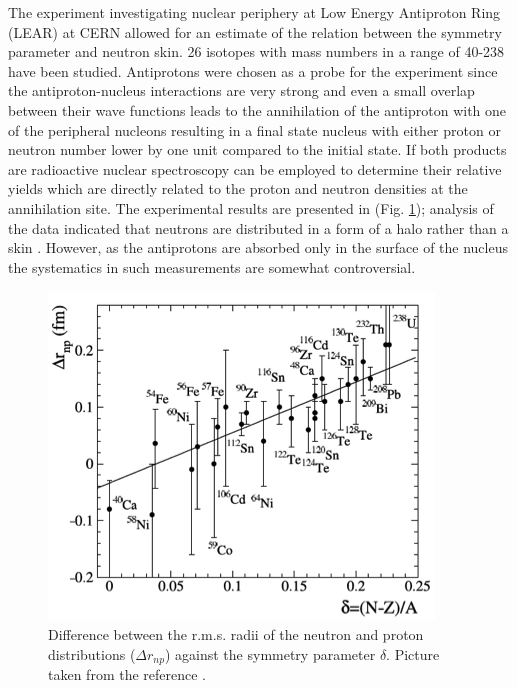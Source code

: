 \indent The experiment investigating nuclear periphery at Low Energy Antiproton Ring (LEAR) at CERN allowed for an estimate of the relation between the symmetry parameter and neutron skin. 26 isotopes with mass numbers in a range of 40-238 have been studied. Antiprotons were chosen as a probe for the experiment since the antiproton-nucleus interactions are very strong and even a small overlap between their wave functions leads to the annihilation of the antiproton with one of the peripheral nucleons resulting in a final state nucleus with either proton or neutron number lower by one unit compared to the initial state. If both products are radioactive nuclear spectroscopy can be employed to determine their relative yields which are directly related to the proton and neutron densities at the annihilation site. The experimental results are presented in (Fig. \ref{antiproton}); analysis of the data indicated that neutrons are distributed in a form of a halo rather than a skin \cite{trzcina}. However, as the antiprotons are absorbed only in the surface of the nucleus the systematics in such measurements are somewhat controversial.

\begin{figure}[H]
\begin{center}
\includegraphics[scale=0.6]{pictures/png/antiproton.png}
\caption{Difference between the r.m.s. radii of the neutron and proton distributions ($\Delta r_{np}$) against the symmetry parameter $\delta$. Picture taken from the reference \cite{trzcina}.}
\label{antiproton}
\end{center}
\end{figure}




